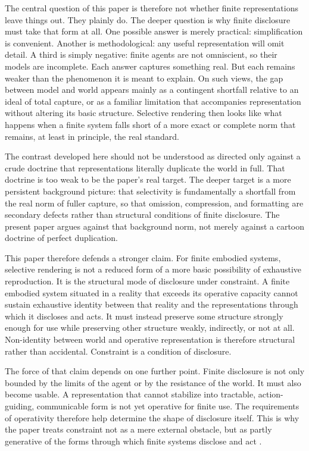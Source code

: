 \documentclass[11pt]{article}
\begin{document}
The central question of this paper is therefore not whether finite representations leave things out. They plainly do. The deeper question is why finite disclosure must take that form at all. One possible answer is merely practical: simplification is convenient. Another is methodological: any useful representation will omit detail. A third is simply negative: finite agents are not omniscient, so their models are incomplete. Each answer captures something real. But each remains weaker than the phenomenon it is meant to explain. On such views, the gap between model and world appears mainly as a contingent shortfall relative to an ideal of total capture, or as a familiar limitation that accompanies representation without altering its basic structure. Selective rendering then looks like what happens when a finite system falls short of a more exact or complete norm that remains, at least in principle, the real standard.

The contrast developed here should not be understood as directed only against a crude doctrine that representations literally duplicate the world in full. That doctrine is too weak to be the paper's real target. The deeper target is a more persistent background picture: that selectivity is fundamentally a shortfall from the real norm of fuller capture, so that omission, compression, and formatting are secondary defects rather than structural conditions of finite disclosure. The present paper argues against that background norm, not merely against a cartoon doctrine of perfect duplication.

This paper therefore defends a stronger claim. For finite embodied systems, selective rendering is not a reduced form of a more basic possibility of exhaustive reproduction. It is the structural mode of disclosure under constraint. A finite embodied system situated in a reality that exceeds its operative capacity cannot sustain exhaustive identity between that reality and the representations through which it discloses and acts. It must instead preserve some structure strongly enough for use while preserving other structure weakly, indirectly, or not at all. Non-identity between world and operative representation is therefore structural rather than accidental. Constraint is a condition of disclosure.

The force of that claim depends on one further point. Finite disclosure is not only bounded by the limits of the agent or by the resistance of the world. It must also become usable. A representation that cannot stabilize into tractable, action-guiding, communicable form is not yet operative for finite use. The requirements of operativity therefore help determine the shape of disclosure itself. This is why the paper treats constraint not as a mere external obstacle, but as partly generative of the forms through which finite systems disclose and act \cite{ConantAshby1970GoodRegulator,Ashby1956IntroductionCybernetics,Simon1982ModelsBoundedRationality}.
\end{document}
